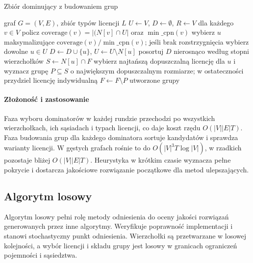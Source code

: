 \begin{algorithm}[H]
  \caption{Zbiór dominujący z budowaniem grup}\label{alg:ds}
  \begin{algorithmic}[1]
    \Require graf $G=(V,E)$, zbiór typów licencji $L$
    \State $U\gets V$, $D\gets\emptyset$, $R\gets V$
    \State dla każdego $v\in V$ policz $\mathrm{coverage}(v)=|(N[v]\cap U|$ oraz $\min\_\mathrm{cpn}(v)$
    \State wybierz $u$ maksymalizujące $\mathrm{coverage}(v)/\min\_\mathrm{cpn}(v)$; jeśli brak rozstrzygnięcia wybierz dowolne $u\in U$
    \State $D\gets D\cup\{u\}$, $U\gets U\setminus N[u]$
    \EndWhile
    \State posortuj $D$ nierosnąco według stopni wierzchołków
    \State $S\gets N[u]\cap F$
    \State wybierz najtańszą dopuszczalną licencję dla $u$ i wyznacz grupę $P\subseteq S$ o największym dopuszczalnym rozmiarze; w ostateczności przydziel licencję indywidualną
    \State $F\gets F\setminus P$
    \EndFor
    \State \Return utworzone grupy
  \end{algorithmic}
\end{algorithm}

\paragraph{Złożoność i zastosowanie}
Faza wyboru dominatorów w każdej rundzie przechodzi po wszystkich wierzchołkach, ich sąsiadach i typach licencji, co daje koszt rzędu $O(|V||E|T)$. Faza budowania grup dla każdego dominatora sortuje kandydatów i sprawdza warianty licencji. W gęstych grafach rośnie to do \(O(|V|^3 T \log |V|)\), w rzadkich pozostaje bliżej $O(|V||E|T)$. Heurystyka w krótkim czasie wyznacza pełne pokrycie i dostarcza jakościowe rozwiązanie początkowe dla metod ulepszających.

\subsection{Algorytm losowy}\label{subsec:random}

Algorytm losowy pełni rolę metody odniesienia do oceny jakości rozwiązań generowanych przez inne algorytmy. Weryfikuje poprawność implementacji i stanowi stochastyczny punkt odniesienia. Wierzchołki są przetwarzane w losowej kolejności, a wybór licencji i składu grupy jest losowy w granicach ograniczeń pojemności i sąsiedztwa.

